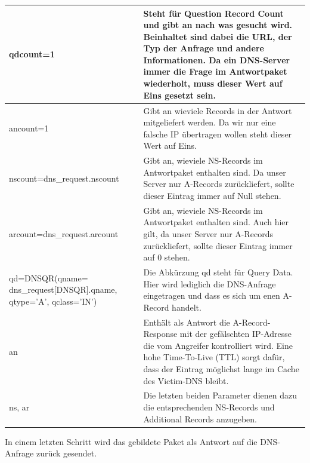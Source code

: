 \documentclass[10pt,a4paper]{article}
\begin{document}
\begin{center}
    \setlength\arrayrulewidth{0.6pt}    
    \begin{tabular}{ | p{4.8cm} | p{8.5cm} |}
    \hline
    qdcount=1 & Steht für Question Record Count und gibt an nach was gesucht wird. Beinhaltet sind dabei die URL, der Typ der Anfrage und andere Informationen. Da ein DNS-Server immer die Frage im Antwortpaket wiederholt, muss dieser Wert auf Eins gesetzt sein.\\ \hline
    ancount=1 & Gibt an wieviele Records in der Antwort mitgeliefert werden. Da wir nur eine falsche IP übertragen wollen steht dieser Wert auf Eins.\\ \hline
    nscount=dns\_request.nscount & Gibt an, wieviele NS-Records im Antwortpaket enthalten sind. Da unser Server nur A-Records zurückliefert, sollte dieser Eintrag immer auf Null stehen.\\ \hline
    arcount=dns\_request.arcount & Gibt an, wieviele NS-Records im Antwortpaket enthalten sind. Auch hier gilt, da unser Server nur A-Records zurückliefert, sollte dieser Eintrag immer auf 0 stehen.\\ \hline
    qd=DNSQR(qname= dns\_request[DNSQR].qname, qtype='A', qclass='IN') & Die Abkürzung qd steht für Query Data. Hier wird lediglich die DNS-Anfrage eingetragen und dass es sich um enen A-Record handelt.\\ \hline
    an & Enthält als Antwort die A-Record-Response mit der gefälschten IP-Adresse die vom Angreifer kontrolliert wird. Eine hohe Time-To-Live (TTL) sorgt dafür, dass der Eintrag möglichst lange im Cache des Victim-DNS bleibt.\\ \hline
    ns, ar & Die letzten beiden Parameter dienen dazu die entsprechenden NS-Records und Additional Records anzugeben.\\
    \hline
    \end{tabular}
\end{center}
In einem letzten Schritt wird das gebildete Paket als Antwort auf die DNS-Anfrage zurück gesendet.
\end{document}
